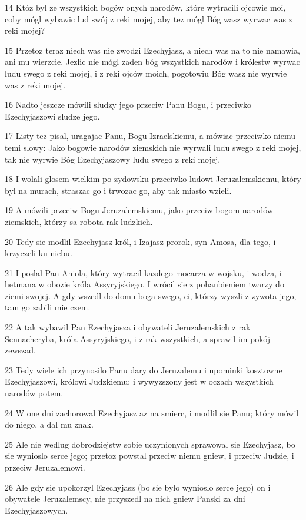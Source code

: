 \par 14 Któz byl ze wszystkich bogów onych narodów, które wytracili ojcowie moi, coby mógl wybawic lud swój z reki mojej, aby tez mógl Bóg wasz wyrwac was z reki mojej?
\par 15 Przetoz teraz niech was nie zwodzi Ezechyjasz, a niech was na to nie namawia, ani mu wierzcie. Jezlic nie mógl zaden bóg wszystkich narodów i królestw wyrwac ludu swego z reki mojej, i z reki ojców moich, pogotowiu Bóg wasz nie wyrwie was z reki mojej.
\par 16 Nadto jeszcze mówili sludzy jego przeciw Panu Bogu, i przeciwko Ezechyjaszowi sludze jego.
\par 17 Listy tez pisal, uragajac Panu, Bogu Izraelskiemu, a mówiac przeciwko niemu temi slowy: Jako bogowie narodów ziemskich nie wyrwali ludu swego z reki mojej, tak nie wyrwie Bóg Ezechyjaszowy ludu swego z reki mojej.
\par 18 I wolali glosem wielkim po zydowsku przeciwko ludowi Jeruzalemskiemu, który byl na murach, straszac go i trwozac go, aby tak miasto wzieli.
\par 19 A mówili przeciw Bogu Jeruzalemskiemu, jako przeciw bogom narodów ziemskich, którzy sa robota rak ludzkich.
\par 20 Tedy sie modlil Ezechyjasz król, i Izajasz prorok, syn Amosa, dla tego, i krzyczeli ku niebu.
\par 21 I poslal Pan Aniola, który wytracil kazdego mocarza w wojsku, i wodza, i hetmana w obozie króla Assyryjskiego. I wrócil sie z pohanbieniem twarzy do ziemi swojej. A gdy wszedl do domu boga swego, ci, którzy wyszli z zywota jego, tam go zabili mie czem.
\par 22 A tak wybawil Pan Ezechyjasza i obywateli Jeruzalemskich z rak Sennacheryba, króla Assyryjskiego, i z rak wszystkich, a sprawil im pokój zewszad.
\par 23 Tedy wiele ich przynosilo Panu dary do Jeruzalemu i upominki kosztowne Ezechyjaszowi, królowi Judzkiemu; i wywyzszony jest w oczach wszystkich narodów potem.
\par 24 W one dni zachorowal Ezechyjasz az na smierc, i modlil sie Panu; który mówil do niego, a dal mu znak.
\par 25 Ale nie wedlug dobrodziejstw sobie uczynionych sprawowal sie Ezechyjasz, bo sie wynioslo serce jego; przetoz powstal przeciw niemu gniew, i przeciw Judzie, i przeciw Jeruzalemowi.
\par 26 Ale gdy sie upokorzyl Ezechyjasz (bo sie bylo wynioslo serce jego) on i obywatele Jeruzalemscy, nie przyszedl na nich gniew Panski za dni Ezechyjaszowych.
